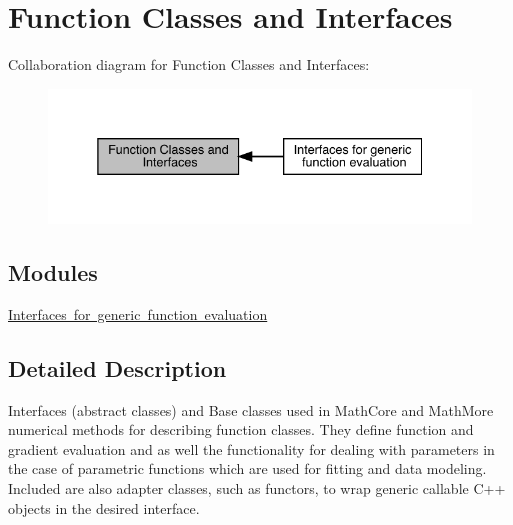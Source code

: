 \hypertarget{group__CppFunctions}{}\section{Function Classes and Interfaces}
\label{group__CppFunctions}
Collaboration diagram for Function Classes and Interfaces\+:\nopagebreak
\begin{figure}[H]
\begin{center}
\leavevmode
\includegraphics[width=338pt]{dd/d47/group__CppFunctions}
\end{center}
\end{figure}
\subsection*{Modules}
\begin{DoxyCompactItemize}
\item 
\mbox{\hyperlink{group__GenFunc}{Interfaces for generic function evaluation}}
\end{DoxyCompactItemize}


\subsection{Detailed Description}
Interfaces (abstract classes) and Base classes used in Math\+Core and Math\+More numerical methods for describing function classes. They define function and gradient evaluation and as well the functionality for dealing with parameters in the case of parametric functions which are used for fitting and data modeling. Included are also adapter classes, such as functors, to wrap generic callable C++ objects in the desired interface. 